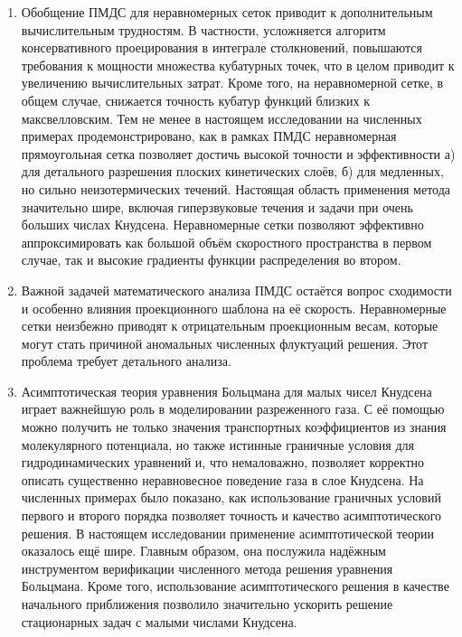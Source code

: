 \begin{enumerate}

\item Обобщение ПМДС для неравномерных сеток приводит к дополнительным вычислительным трудностям.
В частности, усложняется алгоритм консервативного проецирования в интеграле столкновений,
повышаются требования к мощности множества кубатурных точек,
что в целом приводит к увеличению вычислительных затрат.
Кроме того, на неравномерной сетке, в общем случае, снижается точность кубатур функций близких к максвелловским.
Тем не менее в настоящем исследовании на численных примерах продемонстрировано,
как в рамках ПМДС неравномерная прямоугольная сетка позволяет достичь высокой точности и эффективности
а) для детального разрешения плоских кинетических слоёв,
б) для медленных, но сильно неизотермических течений.
Настоящая область применения метода значительно шире, включая
гиперзвуковые течения и задачи при очень больших числах Кнудсена.
Неравномерные сетки позволяют эффективно аппроксимировать
как большой объём скоростного пространства в первом случае,
так и высокие градиенты функции распределения во втором.

\item Важной задачей математического анализа ПМДС остаётся вопрос сходимости
и особенно влияния проекционного шаблона на её скорость.
Неравномерные сетки неизбежно приводят к отрицательным проекционным весам,
которые могут стать причиной аномальных численных флуктуаций решения.
Этот проблема требует детального анализа.

\item Асимптотическая теория уравнения Больцмана для малых чисел Кнудсена
играет важнейшую роль в моделировании разреженного газа.
С её помощью можно получить не только значения транспортных коэффициентов из знания молекулярного потенциала,
но также истинные граничные условия для гидродинамических уравнений и, что немаловажно,
позволяет корректно описать существенно неравновесное поведение газа в слое Кнудсена.
На численных примерах было показано, как использование граничных условий первого и второго порядка
позволяет точность и качество асимптотического решения.
В настоящем исследовании применение асимптотической теории оказалось ещё шире.
Главным образом, она послужила надёжным инструментом верификации численного метода решения уравнения Больцмана.
Кроме того, использование асимптотического решения в качестве начального приближения позволило
значительно ускорить решение стационарных задач с малыми числами Кнудсена.


\end{enumerate}
